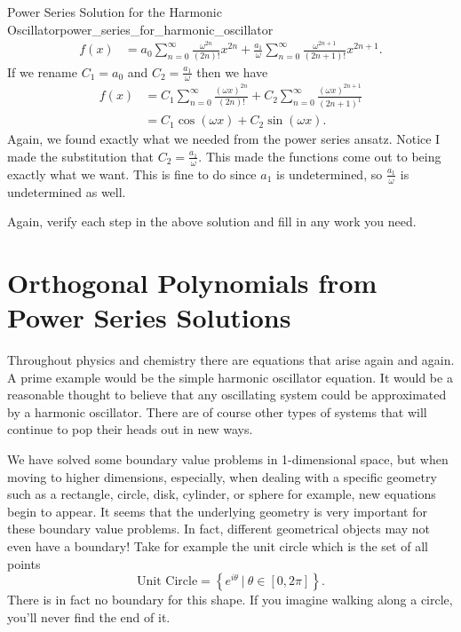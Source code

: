 \begin{ex}{Power Series Solution for the Harmonic Oscillator}{power_series_for_harmonic_oscillator}
\begin{align*}
    f(x)&= a_0 \sum_{n=0}^\infty \frac{\omega^{2n}}{(2n)!}x^{2n} + \frac{a_1}{\omega} \sum_{n=0}^\infty \frac{\omega^{2n+1}}{(2n+1)!} x^{2n+1}.
\end{align*}
If we rename $C_1 = a_0$ and $C_2 = \frac{a_1}{\omega}$ then we have
\begin{align*}
    f(x)&=C_1 \sum_{n=0}^\infty \frac{(\omega x)^{2n}}{(2n)!} + C_2 \sum_{n=0}^\infty \frac{(\omega x)^{2n+1}}{(2n+1)^1}\\
    &= C_1 \cos(\omega x)+C_2 \sin(\omega x).
\end{align*}
Again, we found exactly what we needed from the power series ansatz. Notice I made the substitution that $C_2=\frac{a_1}{\omega}$. This made the functions come out to being exactly what we want.  This is fine to do since $a_1$ is undetermined, so $\frac{a_1}{\omega}$ is undetermined as well.
\end{ex}

\begin{exercise}
Again, verify each step in the above solution and fill in any work you need.
\end{exercise}

\section{Orthogonal Polynomials from Power Series Solutions}

Throughout physics and chemistry there are equations that arise again and again.  A prime example would be the simple harmonic oscillator equation.  It would be a reasonable thought to believe that any oscillating system could be approximated by a harmonic oscillator.  There are of course other types of systems that will continue to pop their heads out in new ways.

We have solved some boundary value problems in 1-dimensional space, but when moving to higher dimensions, especially, when dealing with a specific geometry such as a rectangle, circle, disk, cylinder, or sphere for example, new equations begin to appear. It seems that the underlying geometry is very important for these boundary value problems. In fact, different geometrical objects may not even have a boundary! Take for example the unit circle which is the set of all points 
\[
\textrm{Unit Circle} = \left\{ e^{i \theta} ~|~ \theta \in [0,2\pi]\right\}.
\]
There is in fact no boundary for this shape. If you imagine walking along a circle, you'll never find the end of it.

